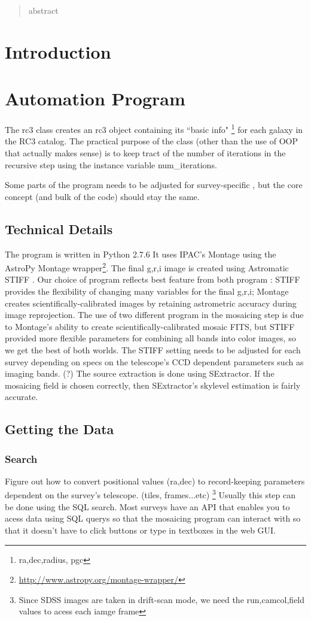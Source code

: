 \documentclass[5p]{elsarticle}
\begin{document}
\begin{abstract}
abstract
\end{abstract}


\section{Introduction}
\section{Automation Program}
	The rc3 class creates an rc3 object containing its ``basic info" \footnote{ ra,dec,radius, pgc} for each galaxy in the RC3 catalog. The practical purpose of the class (other than the use of OOP that actually makes sense) is to keep tract of the number of iterations in the recursive step using the instance variable num\_iterations. 
	
	Some parts of the program needs to be adjusted for survey-specific , but the core concept (and bulk of the code) should stay the same. 

		\subsection{Technical Details}
	The program is written in Python 2.7.6
 It uses IPAC's Montage  \cite{montage} using the AstroPy Montage wrapper\footnote{\url{http://www.astropy.org/montage-wrapper/}}. The final g,r,i image is created using Astromatic STIFF \cite{stiff} . Our choice of program reflects best feature from both program : STIFF provides the flexibility of changing many variables for the final g,r,i; Montage creates scientifically-calibrated images by retaining astrometric accuracy during image reprojection. The use of two different program in the mosaicing step is due to Montage's ability to create scientifically-calibrated mosaic FITS, but STIFF provided more flexible parameters for combining all bands into color images, so we get the best of both worlds. The STIFF setting needs to be adjusted for each survey depending on specs on the telescope's CCD dependent parameters such as imaging bands. (?) The source extraction is done using SExtractor. If the mosaicing field is chosen correctly, then SExtractor's skylevel estimation is fairly accurate.
	\subsection{Getting the Data}
		\subsubsection{Search}
			Figure out how to convert positional values (ra,dec) to record-keeping parameters dependent on the survey's telescope. (tiles, frames...etc) \footnote{Since SDSS images are taken in drift-scan mode, we need the run,camcol,field values to acess each iamge frame} Usually this step can be done using the SQL search. 
Most surveys have an API that enables you to acess data using SQL querys so that the mosaicing program can interact with so that it doesn't have to  click buttons or type in textboxes in the web GUI. 
\end{document}
